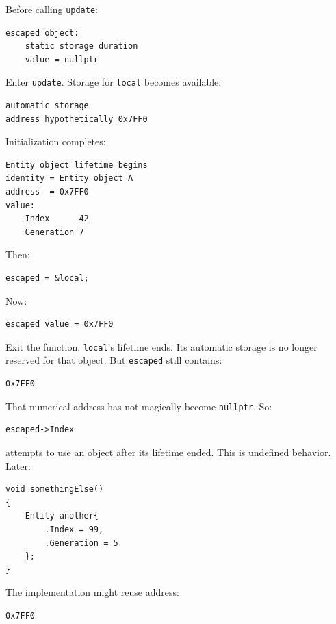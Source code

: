 Before calling \texttt{update}:

\begin{verbatim}
escaped object:
    static storage duration
    value = nullptr
\end{verbatim}

Enter \texttt{update}. Storage for \texttt{local} becomes available:

\begin{verbatim}
automatic storage
address hypothetically 0x7FF0
\end{verbatim}

Initialization completes:

\begin{verbatim}
Entity object lifetime begins
identity = Entity object A
address  = 0x7FF0
value:
    Index      42
    Generation 7
\end{verbatim}

Then:

\begin{verbatim}
escaped = &local;
\end{verbatim}

Now:

\begin{verbatim}
escaped value = 0x7FF0
\end{verbatim}

Exit the function. \texttt{local}'s lifetime ends. Its automatic storage is no longer reserved for that object. But \texttt{escaped} still contains:

\begin{verbatim}
0x7FF0
\end{verbatim}

That numerical address has not magically become \texttt{nullptr}. So:

\begin{verbatim}
escaped->Index
\end{verbatim}

attempts to use an object after its lifetime ended. This is undefined behavior. Later:

\begin{verbatim}
void somethingElse()
{
    Entity another{
        .Index = 99,
        .Generation = 5
    };
}
\end{verbatim}

The implementation might reuse address:

\begin{verbatim}
0x7FF0
\end{verbatim}

